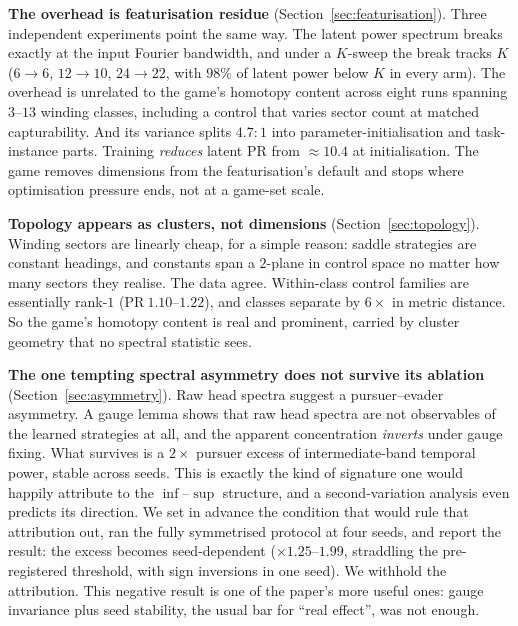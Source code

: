\documentclass[twoside,11pt]{article}
\newcommand{\PR}{\mathrm{PR}}
\begin{document}
\textbf{The overhead is featurisation residue}
(Section~\ref{sec:featurisation}).  Three independent experiments
point the same way.  The latent power spectrum breaks exactly at the
input Fourier bandwidth, and under a $K$-sweep the break
tracks $K$ ($6 \to 6$, $12 \to 10$, $24 \to 22$, with $98\%$ of latent
power below $K$ in every arm).  The overhead is unrelated to the
game's homotopy content across eight runs spanning $3$--$13$ winding
classes, including a control that varies sector count at matched
capturability.  And its variance splits $4.7\!:\!1$ into
parameter-initialisation and task-instance parts.  Training
\emph{reduces} latent $\PR$ from $\approx 10.4$ at initialisation.  The
game removes dimensions from the featurisation's default and stops
where optimisation pressure ends, not at a game-set scale.

\textbf{Topology appears as clusters, not dimensions}
(Section~\ref{sec:topology}).  Winding sectors are linearly cheap, for
a simple reason: saddle strategies are constant headings, and
constants span a $2$-plane in control space no matter how many sectors
they realise.  The data agree.  Within-class control families are
essentially rank-$1$ ($\PR\ 1.10$--$1.22$), and classes separate by
$6\times$ in metric distance.  So the game's homotopy content is real
and prominent, carried by cluster geometry that no spectral statistic
sees.

\textbf{The one tempting spectral asymmetry does not survive its
ablation} (Section~\ref{sec:asymmetry}).  Raw head spectra suggest a
pursuer--evader asymmetry.  A gauge lemma shows that raw head spectra
are not observables of the learned strategies at all, and the apparent
concentration \emph{inverts} under gauge fixing.  What survives is a
$2\times$ pursuer excess of intermediate-band temporal power, stable
across seeds.  This is exactly the kind of signature one would happily
attribute to the $\inf$--$\sup$ structure, and a second-variation
analysis even predicts its direction.  We set in advance the condition
that would rule that attribution out, ran the fully symmetrised
protocol at four seeds, and report the result: the excess becomes
seed-dependent ($\times 1.25$--$1.99$, straddling the pre-registered
threshold, with sign inversions in one seed).  We withhold the
attribution.  This negative result is one of the paper's more useful
ones: gauge invariance plus seed stability, the usual bar for ``real
effect'', was not enough.
\end{document}
